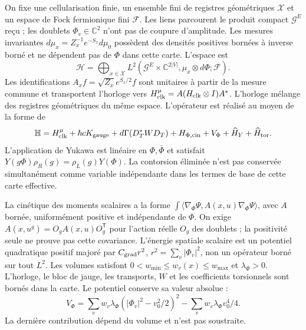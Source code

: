 On fixe une cellularisation finie, un ensemble fini de registres géométriques $\mathcal X$ et un espace de Fock fermionique fini $\mathcal F$. Les liens parcourent le produit compact $\mathcal G^E$ reçu ; les doublets $\Phi_v\in\mathbb C^2$ n’ont pas de coupure d’amplitude. Les mesures invariantes $d\mu_x=Z_x^{-1}e^{-S_x}d\mu_0$ possèdent des densités positives bornées à inverse borné et ne dépendent pas de $\Phi$ dans cette carte. L’espace est
\[
\mathscr H=\bigoplus_{x\in\mathcal X}
L^2(\mathcal G^E\times\mathbb C^{2|V|},
\mu_x\otimes d\Phi;\mathcal F).
\]
Les identifications $A_xf=\sqrt{Z_x}e^{S_x/2}f$ sont unitaires à partir de la mesure commune et transportent l’horloge vers $H_{\rm clk}^{\mu}=A(H_{\rm clk}\otimes I)A^*$. L’horloge mélange des registres géométriques du même espace. L’opérateur est réalisé au moyen de la forme de
\begin{equation}
\mathbb H=H_{\rm clk}^{\mu}+\hbar cK_{\rm gauge}
+d\Gamma(D_T^*WD_T)+H_{\Phi,\rm cin}+V_\Phi
+\widehat H_Y+\widehat H_{\rm tor}.
\label{hmtcuatro:gea:total}
\end{equation}
L’application de Yukawa est linéaire en $\Phi,\bar\Phi$ et satisfait $Y(g\Phi)\rho_R(g)=\rho_L(g)Y(\Phi)$. La contorsion éliminée n’est pas conservée simultanément comme variable indépendante dans les termes de base de cette carte effective.

La cinétique des moments scalaires a la forme $\int\langle\nabla_\Phi\Psi,A(x,u)\nabla_\Phi\Psi\rangle$, avec $A$ bornée, uniformément positive et indépendante de $\Phi$. On exige $A(x,u^g)=O_gA(x,u)O_g^{\mathsf T}$ pour l’action réelle $O_g$ des doublets ; la positivité seule ne prouve pas cette covariance. L’énergie spatiale scalaire est un potentiel quadratique positif majoré par $C_{\rm grad}r^2$, $r^2=\sum_v|\Phi_v|^2$, non un opérateur borné sur tout $L^2$. Les volumes satisfont $0<w_{\min}\leq w_v(x)\leq w_{\max}$ et $\lambda_\Phi>0$. L’horloge, le bloc de jauge, les transports, $W$ et les coefficients torsionnels sont bornés dans la carte. Le potentiel conserve sa valeur absolue :
\begin{equation}
V_\Phi=\sum_vw_v\lambda_\Phi(|\Phi_v|^2-v_0^2/2)^2
-\sum_vw_v\lambda_\Phi v_0^4/4.
\label{hmtcuatro:gea:potencial}
\end{equation}
La dernière contribution dépend du volume et n’est pas soustraite.

